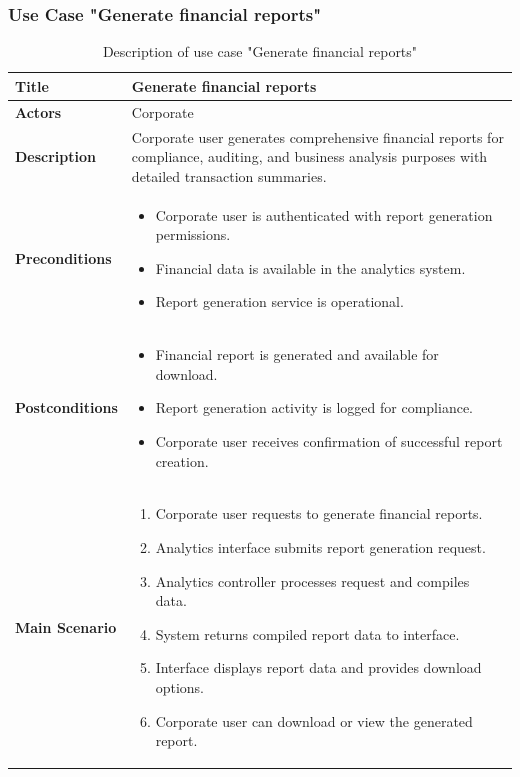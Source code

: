 \subsubsection{Use Case "Generate financial reports"}
\begin{longtable}{|p{}|p{}|}
  \caption{Description of use case "Generate financial reports"}
  \label{tab:uc_generate_reports} \\
  \hline
  \textbf{Title} & Generate financial reports \\ \hline
  \textbf{Actors} & Corporate \\ \hline
  \textbf{Description} & Corporate user generates comprehensive financial reports for compliance, auditing, and business analysis purposes with detailed transaction summaries. \\ \hline
  \textbf{Preconditions} & 
    \begin{itemize}[nosep,leftmargin=*]
      \item Corporate user is authenticated with report generation permissions.
      \item Financial data is available in the analytics system.
      \item Report generation service is operational.
    \end{itemize} \\ \hline
  \textbf{Postconditions} & 
    \begin{itemize}[nosep,leftmargin=*]
      \item Financial report is generated and available for download.
      \item Report generation activity is logged for compliance.
      \item Corporate user receives confirmation of successful report creation.
    \end{itemize} \\ \hline
  \textbf{Main Scenario} &
    \begin{enumerate}[nosep,leftmargin=*]
      \item Corporate user requests to generate financial reports.
      \item Analytics interface submits report generation request.
      \item Analytics controller processes request and compiles data.
      \item System returns compiled report data to interface.
      \item Interface displays report data and provides download options.
      \item Corporate user can download or view the generated report.

\end{enumerate}
\end{longtable}
